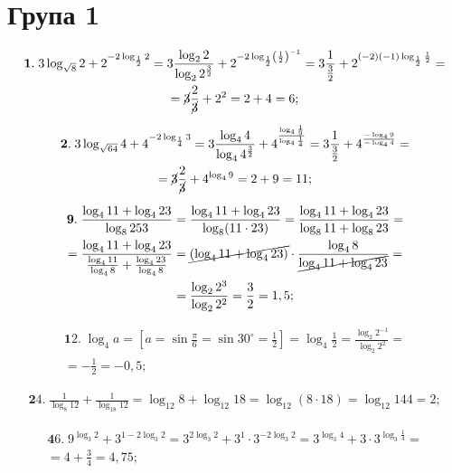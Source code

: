 \section*{Група 1}
\begin{multline*}
{\mathbf 1.}\;
3 \log_{\sqrt{8}} 2 + 2^{-2\log_{\frac{1}{2}} 2} =
3\frac{\log_2 2}{\log_2 2^\frac{3}{2}} + 2^{-2 \log_{\frac{1}{2}} \left(\frac{1}{2}\right)^{-1}} =
3\frac{1}{\frac{3}{2}} + 2^{(-2)(-1)\log_{\frac{1}{2}} \frac{1}{2}} =\\
= \cancel{3}\frac{2}{\cancel{3}} + 2^2 = 2 + 4 = 6;
\end{multline*}

\begin{multline*}
{\mathbf 2.}\;
3\log_{\sqrt{64}} 4 + 4^{-2\log_{\frac{1}{4}} 3} =
3\frac{\log_4 4}{\log_4 4^{\frac{3}{2}}} + 4^{\frac{\log_4 \frac{1}{9}}{\log_4 \frac{1}{4}}} =
3\frac{1}{\frac{3}{2}} + 4^{\frac{-\log_4 9}{-\log_4 4}} =\\
= \cancel{3}\frac{2}{\cancel{3}} + 4^{\log_4 9} = 2 + 9 = 11;
\end{multline*}

\begin{multline*}
{\mathbf 9.}\;
\frac{\log_4 11 + \log_4 23}{\log_8 253} =
\frac{\log_4 11 + \log_4 23}{\log_8 (11 \cdot 23)} =
\frac{\log_4 11 + \log_4 23}{\log_8 11 + \log_8 23} =\\
= \frac{\log_4 11 + \log_4 23}{\frac{\log_4 11}{\log_4 8} + \frac{\log_4 23}{\log_4 8}} =
\cancel{\left(\log_4 11 + \log_4 23\right)} \cdot \frac{\log_4 8}{\cancel{\log_4 11 + \log_4 23}} =\\
= \frac{\log_2 2^3}{\log_2 2^2} = \frac{3}{2} = 1,5;
\end{multline*}

\begin{multline*}
{\mathbf 12.}\;
\log_4 a =
\left[a = \sin \frac{\pi}{6} = \sin 30^\circ = \frac{1}{2}\right] =
\log_4 \frac{1}{2} =
\frac{\log_2 2^{-1}}{\log_2 2^2} =\\
= -\frac{1}{2} = -0,5;
\end{multline*}

\begin{multline*}
{\mathbf 24.}\;
\frac{1}{\log_8 12} + \frac{1}{\log_{18} 12} =
\log_{12} 8 + \log_{12} 18 =
\log_{12} (8 \cdot 18) =
\log_{12} 144 = 2;
\end{multline*}

\begin{multline*}
{\mathbf 46.}\;
9^{\log_3 2} + 3^{1 - 2\log_3 2} =
3^{2\log_3 2} + 3^1 \cdot 3^{-2\log_3 2} =
3^{\log_3 4} + 3 \cdot 3^{\log_3 \frac{1}{4}} =\\
= 4 + \frac{3}{4} = 4,75;
\end{multline*}

